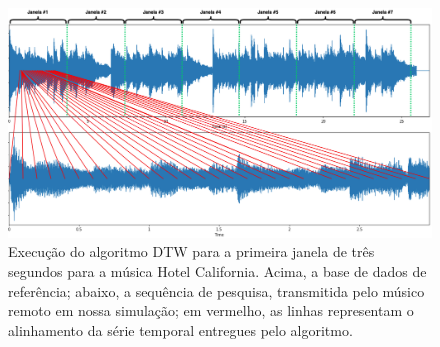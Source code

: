 \begin{figure}[htbp]
    \centering
    \includegraphics[width=1\textwidth]{images/dtw hotel California.png}
    \caption{Execução do algoritmo DTW para a primeira janela de três segundos para a música Hotel California. Acima, a base de dados de referência; abaixo, a sequência de pesquisa, transmitida pelo músico remoto em nossa simulação; em vermelho, as linhas representam o alinhamento da série temporal entregues pelo algoritmo.}
    \label{fig:dtw_hotel_california}
\end{figure}
